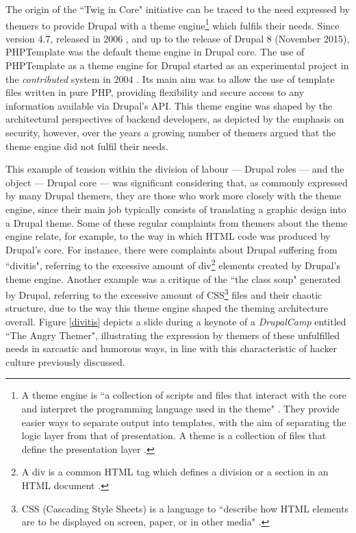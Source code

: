 The origin of the ``Twig in Core" initiative can be traced to the need expressed by themers to provide Drupal with a theme engine\footnote{A theme engine is ``a collection of scripts and files that interact with the core and interpret the programming language used in the theme" \parencite{theme-engine:Online}. They provide easier ways to separate output into templates, with the aim of separating the logic layer from that of presentation. A theme is a collection of files that define the presentation layer \parencite{theme:Online}.} which fulfils their needs. Since version 4.7, released in 2006 \parencite{drupal_4_7:Online}, and up to the release of Drupal 8 (November 2015), PHPTemplate was the default theme engine in Drupal core. The use of PHPTemplate as a theme engine for Drupal started as an experimental project in the \textit{contributed} system in 2004 \parencite{phptemplate:Online}. Its main aim was to allow the use of template files written in pure PHP, providing flexibility and secure access to any information available via Drupal's API. This theme engine was shaped by the architectural perspectives of backend developers, as depicted by the emphasis on security, however, over the years a growing number of themers argued that the theme engine did not fulfil their needs.

This example of tension within the division of labour --- Drupal roles --- and the object --- Drupal core --- was significant considering that, as commonly expressed by many Drupal themers, they are those who work more closely with the theme engine, since their main job typically consists of translating a graphic design into a Drupal theme. Some of these regular complaints from themers about the theme engine relate, for example, to the way in which HTML code was produced by Drupal's core. For instance, there were complaints about Drupal suffering from ``divitis", referring to the  excessive amount of div\footnote{A div is a common HTML tag which defines a division or a section in an HTML document \parencite{div:Online}.} elements created by Drupal's theme engine. Another example was a critique of the ``the class soup" generated by Drupal, referring to the excessive amount of CSS\footnote{CSS (Cascading Style Sheets) is a language to ``describe how HTML elements are to be displayed on screen, paper, or in other media" \parencite{css:Online}.} files and their chaotic structure, due to the way this theme engine shaped the theming architecture overall. Figure \ref{divitis} depicts a slide during a keynote of a \textit{DrupalCamp} entitled ``The Angry Themer", illustrating the expression by themers of  these unfulfilled needs in sarcastic and humorous ways, in line with this characteristic of hacker culture \parencite[116]{coleman2013coding} previously discussed.

